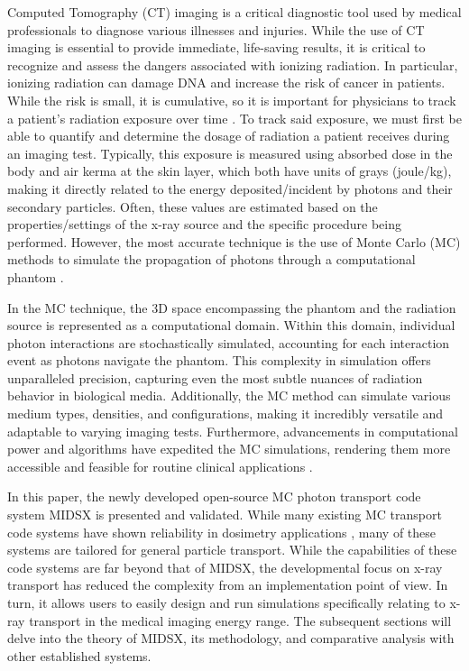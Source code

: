 \par Computed Tomography (CT) imaging is a critical diagnostic tool used by medical professionals to diagnose various illnesses and injuries. While the use of CT imaging is essential to provide immediate, life-saving results, it is critical to recognize and assess the dangers associated with ionizing radiation. In particular, ionizing radiation can damage DNA and increase the risk of cancer in patients. While the risk is small, it is cumulative, so it is important for physicians to track a patient's radiation exposure over time \cite{lauer2009elements}. To track said exposure, we must first be able to quantify and determine the dosage of radiation a patient receives during an imaging test. Typically, this exposure is measured using absorbed dose in the body and air kerma at the skin layer, which both have units of grays (joule/kg), making it directly related to the energy deposited/incident by photons and their secondary particles. Often, these values are estimated based on the properties/settings of the x-ray source and the specific procedure being performed. However, the most accurate technique is the use of Monte Carlo (MC) methods to simulate the propagation of photons through a computational phantom \cite{essmedphys2012}. 
\par In the MC technique, the 3D space encompassing the phantom and the radiation source is represented as a computational domain. Within this domain, individual photon interactions are stochastically simulated, accounting for each interaction event as photons navigate the phantom. This complexity in simulation offers unparalleled precision, capturing even the most subtle nuances of radiation behavior in biological media. Additionally, the MC method can simulate various medium types, densities, and configurations, making it incredibly versatile and adaptable to varying imaging tests. Furthermore, advancements in computational power and algorithms have expedited the MC simulations, rendering them more accessible and feasible for routine clinical applications \cite{fernandez_bosman_validation_2021}.
\par In this paper, the newly developed open-source MC photon transport code system MIDSX is presented and validated. While many existing MC transport code systems have shown reliability in dosimetry applications \cite{fernandez_bosman_validation_2021, geant4valid2004}, many of these systems are tailored for general particle transport. While the capabilities of these code systems are far beyond that of MIDSX, the developmental focus on x-ray transport has reduced the complexity from an implementation point of view. In turn, it allows users to easily design and run simulations specifically relating to x-ray transport in the medical imaging energy range. The subsequent sections will delve into the theory of MIDSX, its methodology, and comparative analysis with other established systems.